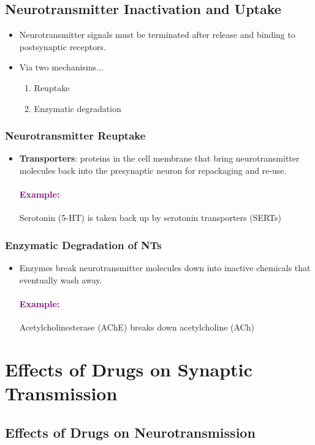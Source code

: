 \documentclass[12pt,a4paper]{article}
\newcommand{\example}[1]{\paragraph{\textcolor{purple}{Example:}} #1}
\begin{document}
	\subsection{Neurotransmitter Inactivation and Uptake}
	
	\begin{itemize}
		\item Neurotransmitter signals must be terminated after release and binding to postsynaptic receptors. 
		\item Via two mechanisms...
		\begin{enumerate}
			\item Reuptake
			\item Enzymatic degradation
		\end{enumerate}
	\end{itemize}
	
	\subsubsection{Neurotransmitter Reuptake}
	
	\begin{itemize}
		\item \textbf{Transporters}: proteins in the cell membrane that bring neurotransmitter molecules back into the presynaptic neuron for repackaging and re-use. 
		\subitem \example{Serotonin (5-HT) is taken back up by serotonin transporters (SERTs)}
	\end{itemize}
	
	\subsubsection{Enzymatic Degradation of NTs}
	\begin{itemize}
		\item Enzymes break neurotransmitter molecules down into inactive chemicals that eventually wash away. 
		\subitem \example{Acetylcholinesterase (AChE) breaks down acetylcholine (ACh)}
	\end{itemize}
	
	\section{Effects of Drugs on Synaptic Transmission}
	
	\subsection{Effects of Drugs on Neurotransmission}
	
\end{document}
